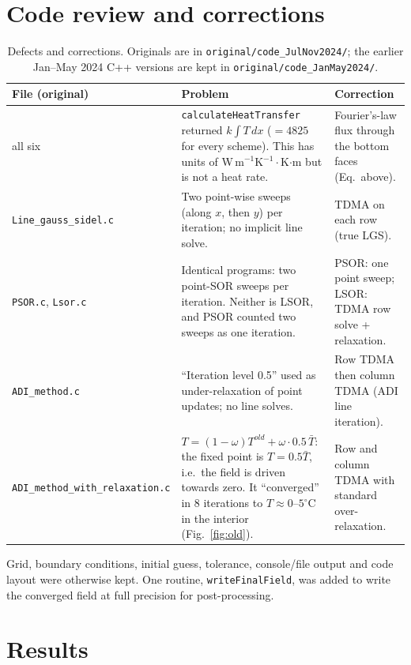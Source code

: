 \section{Code review and corrections}
\begin{table}[H]\centering\small
\begin{tabular}{p{2.6cm}p{6.6cm}p{6.1cm}}\toprule
File (original) & Problem & Correction\\\midrule
all six & \texttt{calculateHeatTransfer} returned $k\int T\,dx$ ($=4825$ for every scheme). This has units of W\,m$^{-1}$K$^{-1}\cdot$K$\cdot$m but is not a heat rate. & Fourier's-law flux through the bottom faces (Eq.~above).\\
\texttt{Line\_gauss\_sidel.c} & Two point-wise sweeps (along $x$, then $y$) per iteration; no implicit line solve. & TDMA on each row (true LGS).\\
\texttt{PSOR.c}, \texttt{Lsor.c} & Identical programs: two point-SOR sweeps per iteration. Neither is LSOR, and PSOR counted two sweeps as one iteration. & PSOR: one point sweep; LSOR: TDMA row solve + relaxation.\\
\texttt{ADI\_method.c} & ``Iteration level 0.5'' used as under-relaxation of point updates; no line solves. & Row TDMA then column TDMA (ADI line iteration).\\
\texttt{ADI\_method\_with\_relaxation.c} & $T=(1-\omega)T^{old}+\omega\cdot0.5\,\bar T$: the fixed point is $T=0.5\bar T$, i.e.\ the field is driven towards zero. It ``converged'' in 8 iterations to $T\approx0$--$5^\circ$C in the interior (Fig.~\ref{fig:old}). & Row and column TDMA with standard over-relaxation.\\\bottomrule
\end{tabular}\caption{Defects and corrections. Originals are in \texttt{original/code\_JulNov2024/}; the earlier Jan--May 2024 C++ versions are kept in \texttt{original/code\_JanMay2024/}.}\end{table}
Grid, boundary conditions, initial guess, tolerance, console/file output and code layout were otherwise kept. One routine, \texttt{writeFinalField}, was added to write the converged field at full precision for post-processing.

\section{Results}
